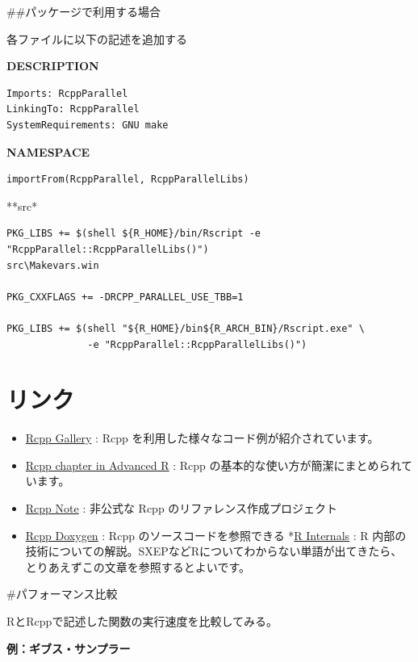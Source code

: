 \documentclass[]{book}
\providecommand{\tightlist}{%
  \setlength{\itemsep}{0pt}\setlength{\parskip}{0pt}}
\begin{document}
\#\#パッケージで利用する場合

各ファイルに以下の記述を追加する

\textbf{DESCRIPTION}

\begin{verbatim}
Imports: RcppParallel
LinkingTo: RcppParallel
SystemRequirements: GNU make
\end{verbatim}

\textbf{NAMESPACE}

\begin{verbatim}
importFrom(RcppParallel, RcppParallelLibs)
\end{verbatim}

**src\Makevars**

\begin{verbatim}
PKG_LIBS += $(shell ${R_HOME}/bin/Rscript -e "RcppParallel::RcppParallelLibs()")
src\Makevars.win

PKG_CXXFLAGS += -DRCPP_PARALLEL_USE_TBB=1

PKG_LIBS += $(shell "${R_HOME}/bin${R_ARCH_BIN}/Rscript.exe" \
              -e "RcppParallel::RcppParallelLibs()")
\end{verbatim}

\chapter{リンク}

\begin{itemize}
\tightlist
\item
  \href{http://gallery.rcpp.org/}{Rcpp Gallery} : Rcpp を利用した様々なコード例が紹介されています。
\item
  \href{http://adv-r.had.co.nz/Rcpp.html}{Rcpp chapter in Advanced R} : Rcpp の基本的な使い方が簡潔にまとめられています。
\item
  \href{http://statr.me/rcpp-note/index.html}{Rcpp Note} :
  非公式な Rcpp のリファレンス作成プロジェクト
\item
  \href{http://dirk.eddelbuettel.com/code/rcpp/html/}{Rcpp Doxygen} : Rcpp のソースコードを参照できる
  *\href{https://cran.r-project.org/doc/manuals/r-release/R-ints.html}{R Internals} : R 内部の技術についての解説。SXEPなどRについてわからない単語が出てきたら、とりあえずこの文章を参照するとよいです。
\end{itemize}

\#パフォーマンス比較

RとRcppで記述した関数の実行速度を比較してみる。

\textbf{例：ギブス・サンプラー}
\end{document}
